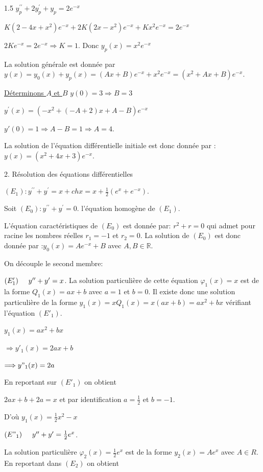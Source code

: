 \documentclass[12pt]{article}
\begin{document}
\begin{spacing}{1.5}
$y_{p}^{\prime\prime}+2y_{p}^{\prime}+y_p=2e^{-x}$

$K(2-4x+x^2)e^{-x}+2K(2x-x^2)e^{-x} +Kx^2e^{-x}=2e^{-x}$

$2Ke^{-x}=2e^{-x} \Rightarrow K=1$. Donc $y_p(x)=x^2e^{-x}$

La solution générale est donnée par $y(x)=y_0(x)+y_p(x)=(Ax+B)e^{-x}+x^2e^{-x}=(x^2+Ax+B)e^{-x}$.

\underline{Déterminons $A$ et $B$}
$y(0)=3\Longrightarrow B=3$

$y^{\prime}(x)=(-x^2+(-A+2)x+A-B)e^{-x}$

$y'(0)=1\Longrightarrow A-B=1\Longrightarrow A=4$.

La solution de l'équation différentielle initiale est donc donnée par : $y(x)=(x^2+4x+3)e^{-x}$.

2. Résolution des équations différentielles


$(E_1): y^{\prime\prime}+y^{\prime}=x+chx=x+\frac{1}{2}(e^x+e^{-x})$.

Soit $(E_0):y^{\prime\prime}+y^{\prime}=0$. l'équation homogène de $(E_1)$.

L'équation caractéristiques de $(E_0)$ est donnée par: $r^2+r=0$ qui admet pour racine les nombres réelles $r_1=-1$ et $r_2=0$. La solution de $(E_0)$ est donc donnée par :$y_0(x)=Ae^{-x}+B$ avec $A,B\in \mathbb{R}$.

On découple le second membre:

\medskip $(E'_1)\hspace{0.5cm}y^{\prime\prime}+y^{\prime}=x$. La solution particulière de cette équation $\varphi_1(x)=x$ est de la forme $Q_1(x)=ax+b$ avec $a=1$ et $b=0$. Il existe donc une solution particulière de la forme $y_1(x)=xQ_1(x)=x(ax+b)=ax^2+bx$ vérifiant l'équation  $(E'_1)$.

$y_1(x)=ax^2+bx$

$\Longrightarrow y'_1(x)=2ax+b$

$\Longrightarrow y"_1(x)=2a$

En reportant sur $(E'_1)$ on obtient

$2ax+b+2a=x$ et par identification $a=\frac{1}{2} $ et $b=-1$.

D'où $y_1(x)=\frac{1}{2}x^2-x$

\medskip$(E"_1)\hspace{0.5cm}y^{\prime\prime}+y^{\prime}=\frac{1}{2}e^x$.

La solution particulière $\varphi_2(x)=\frac{1}{2}e^x$ est de la forme $y_2(x)=Ae^x$ avec $A\in R$. En reportant dans $(E_2)$ on obtient 


\end{spacing}
\end{document}
